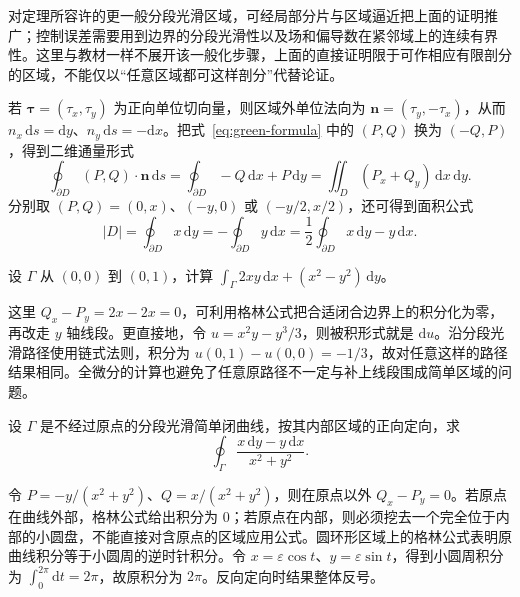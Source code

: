 \documentclass[UTF8,12pt,a4paper,fontset=fandol]{ctexbook}
\begin{document}
对定理所容许的更一般分段光滑区域，可经局部分片与区域逼近把上面的证明推广；控制误差需要用到边界的分段光滑性以及场和偏导数在紧邻域上的连续有界性。这里与教材一样不展开该一般化步骤，上面的直接证明限于可作相应有限剖分的区域，不能仅以“任意区域都可这样剖分”代替论证。

若 $\boldsymbol\tau=(\tau_x,\tau_y)$ 为正向单位切向量，则区域外单位法向为 $\boldsymbol n=(\tau_y,-\tau_x)$，从而 $n_x\,\mathrm ds=\mathrm dy$、$n_y\,\mathrm ds=-\mathrm dx$。把式~\eqref{eq:green-formula} 中的 $(P,Q)$ 换为 $(-Q,P)$，得到二维通量形式
\begin{equation}
\label{eq:green-flux-formula}
    \oint_{\partial D}(P,Q)\cdot\boldsymbol n\,\mathrm ds
    =\oint_{\partial D}-Q\,\mathrm dx+P\,\mathrm dy
    =\iint_D(P_x+Q_y)\,\mathrm dx\,\mathrm dy.
\end{equation}
分别取 $(P,Q)=(0,x)$、$(-y,0)$ 或 $(-y/2,x/2)$，还可得到面积公式
\begin{equation}
\label{eq:green-area-formula}
    |D|=\oint_{\partial D}x\,\mathrm dy
       =-\oint_{\partial D}y\,\mathrm dx
       =\frac12\oint_{\partial D}x\,\mathrm dy-y\,\mathrm dx.
\end{equation}

\begin{example}
\label{ex:green-exact-integral}
设 $\Gamma$ 从 $(0,0)$ 到 $(0,1)$，计算 $\int_\Gamma2xy\,\mathrm dx+(x^2-y^2)\,\mathrm dy$。
\end{example}
\begin{solve}
这里 $Q_x-P_y=2x-2x=0$，可利用格林公式把合适闭合边界上的积分化为零，再改走 $y$ 轴线段。更直接地，令 $u=x^2y-y^3/3$，则被积形式就是 $\mathrm du$。沿分段光滑路径使用链式法则，积分为 $u(0,1)-u(0,0)=-1/3$，故对任意这样的路径结果相同。全微分的计算也避免了任意原路径不一定与补上线段围成简单区域的问题。
\end{solve}

\begin{example}
\label{ex:green-angular-integral}
设 $\Gamma$ 是不经过原点的分段光滑简单闭曲线，按其内部区域的正向定向，求
\[
    \oint_\Gamma\frac{x\,\mathrm dy-y\,\mathrm dx}{x^2+y^2}.
\]
\end{example}
\begin{solve}
令 $P=-y/(x^2+y^2)$、$Q=x/(x^2+y^2)$，则在原点以外 $Q_x-P_y=0$。若原点在曲线外部，格林公式给出积分为 $0$；若原点在内部，则必须挖去一个完全位于内部的小圆盘，不能直接对含原点的区域应用公式。圆环形区域上的格林公式表明原曲线积分等于小圆周的逆时针积分。令 $x=\varepsilon\cos t$、$y=\varepsilon\sin t$，得到小圆周积分为 $\int_0^{2\pi}\mathrm dt=2\pi$，故原积分为 $2\pi$。反向定向时结果整体反号。
\end{solve}
\end{document}
